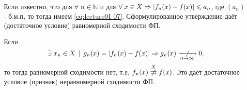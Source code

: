 \begin{notes}
	\item Если известно, что для $\forall \; n \in \mathbb{N}$ и для $\forall \; x \in X \Rightarrow
	\left\lvert f_n(x) - f(x) \right\rvert \leqslant a_n$, где $(a_n)$ - б.м.п, то тогда имеем \eqref{eq:lecture01-07}.
	Сформулированное утверждение даёт  (достаточное условие)
	равномерной сходимости ФП.
	\item Если
	\begin{equation*}
	\exists \; x_n \in X \; \,\vert\,\; g_n(x) = \abs{f_n(x) - f(x)} \Rightarrow g_n(x) \centernot{
		\xrightarrow[n \to \infty]{}} 0,
	\end{equation*}
	то тогда равномерной сходимости нет, т.е. $f_n(x) \centernot{\overset{X}{\rightrightarrows}} f(x)$. Это
	даёт достаточное условие (признак) неравномерной сходимости ФП.
\end{notes}